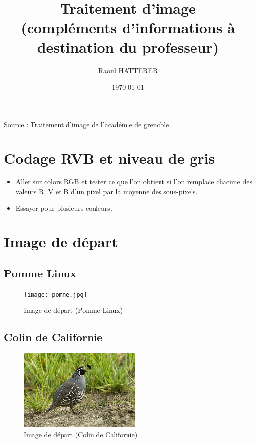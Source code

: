 \documentclass[11pt]{article}
\author{Raoul HATTERER}
\date{\today}
\title{Traitement d'image\\\medskip
\large (compléments d'informations à destination du professeur)}
\begin{document}
\maketitle
\tableofcontents

Source : \href{http://www.ac-grenoble.fr/disciplines/informatiquelycee/n\_site/snt\_photo\_transImg.html}{Traitement d'image de l'académie de grenoble}



\section{Codage RVB et niveau de gris}
\label{sec:org89e55a4}

\begin{itemize}
\item Aller sur \href{https://www.w3schools.com/colors/colors\_rgb.asp}{colors RGB} et tester ce que l'on obtient si l'on remplace chacune des valeurs R, V et B d'un pixel par la moyenne des sous-pixels.
\item Essayer pour plusieurs couleurs.
\end{itemize}


\section{Image de départ}
\label{sec:orgb0244b0}

\subsection{Pomme Linux}
\label{sec:orgf0a3dd5}

\begin{figure}[htbp]
\centering
\texttt{[image: pomme.jpg]}
\caption{Image de départ (Pomme Linux)}
\end{figure}

\subsection{Colin de Californie}
\label{sec:orgf5bfff3}

\begin{figure}[htbp]
\centering
\includegraphics[width=6cm]{California_Quail.jpg}
\caption{Image de départ (Colin de Californie)}
\end{figure}
\end{document}
